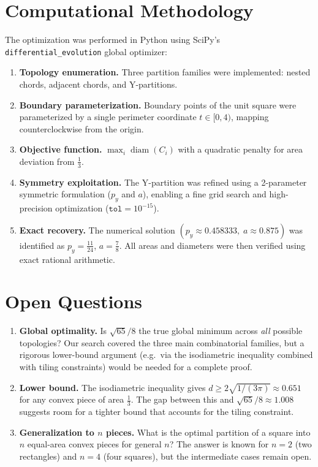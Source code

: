 \documentclass[11pt]{article}
\theoremstyle{definition}
\begin{document}
\section{Computational Methodology}

The optimization was performed in Python using SciPy's
\texttt{differential\_evolution} global optimizer:

\begin{enumerate}
\item \textbf{Topology enumeration.}
  Three partition families were implemented: nested chords, adjacent
  chords, and Y-partitions.

\item \textbf{Boundary parameterization.}
  Boundary points of the unit square were parameterized by a single
  perimeter coordinate $t \in [0,4)$, mapping counterclockwise from the
  origin.

\item \textbf{Objective function.}
  $\max_i \operatorname{diam}(C_i)$ with a quadratic penalty for
  area deviation from $\tfrac{1}{3}$.

\item \textbf{Symmetry exploitation.}
  The Y-partition was refined using a 2-parameter symmetric
  formulation ($p_y$ and $a$), enabling a fine grid search and
  high-precision optimization ($\texttt{tol} = 10^{-15}$).

\item \textbf{Exact recovery.}
  The numerical solution $(p_y \approx 0.458333,\; a \approx 0.875)$
  was identified as $p_y = \tfrac{11}{24}$, $a = \tfrac{7}{8}$.
  All areas and diameters were then verified using exact rational
  arithmetic.
\end{enumerate}

\section{Open Questions}

\begin{enumerate}
\item \textbf{Global optimality.}
  Is $\sqrt{65}/8$ the true global minimum across \emph{all} possible
  topologies? Our search covered the three main combinatorial families,
  but a rigorous lower-bound argument (e.g.\ via the isodiametric
  inequality combined with tiling constraints) would be needed for a
  complete proof.

\item \textbf{Lower bound.}
  The isodiametric inequality gives $d \geq 2\sqrt{1/(3\pi)} \approx
  0.651$ for any convex piece of area $\tfrac{1}{3}$. The gap between
  this and $\sqrt{65}/8 \approx 1.008$ suggests room for a tighter
  bound that accounts for the tiling constraint.

\item \textbf{Generalization to $n$ pieces.}
  What is the optimal partition of a square into $n$ equal-area convex
  pieces for general $n$? The answer is known for $n = 2$ (two
  rectangles) and $n = 4$ (four squares), but the intermediate cases
  remain open.
\end{enumerate}
\end{document}
